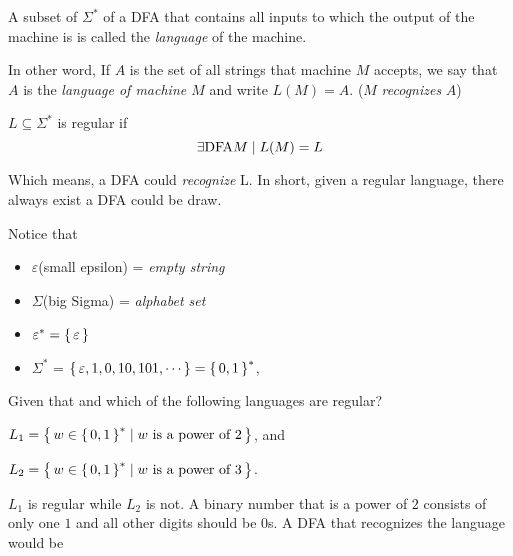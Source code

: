 
\begin{definition}

A subset of $\Sigma^*$ of a DFA that contains all inputs to which the output of the
machine is \true is called the \emph{language} of the machine.

\end{definition}

In other word, If $A$ is the set of all strings that machine $M$ accepts, we say that $A$
is the \emph{ language of machine $M$} and write $L(M) = A$. ($M$ \emph{recognizes} $A$)
\begin{definition}
    $ L \subseteq \Sigma^* $
    is regular if
    \[
        \exists {\text{\upshape DFA} M} \mid L(M) = L
    \]
\end{definition}

Which means, a DFA could \emph{recognize} L. In short, given a regular language, there
always exist a DFA could be draw.

Notice that 
\begin{itemize}
    \item
        $\varepsilon$(small epsilon) = \emph{ empty string } 
    \item
        $\Sigma$(big Sigma)          = \emph{ alphabet set } 
    \item
        $\varepsilon^*               = { \left\{\,\varepsilon\,\right\} }$  
    \item
        $\Sigma^*$                   = ${ \left\{\,\varepsilon,1,0,10,101,\cdots\,\right\} } = { \left\{\,0,1\,\right\} }^*$,
\end{itemize}

\begin{example}
    Given that
    and
    which of the following languages are regular?
    \begin{compactitem}
    \item
        $L_1 = { \left\{\, w \in { \left\{\,0,1\,\right\} }^* \mid w \text{ is a power of } 2\,\right\} }$, and
    \item
        $L_2 = { \left\{\, w \in { \left\{\,0,1\,\right\} }^* \mid w \text{ is a power of } 3\,\right\} }$.
    \end{compactitem}
    
    $L_1$ is regular while $L_2$ is not. A binary number that is a power of $2$ consists
    of only one $1$ and all other digits should be $0$s. A DFA that recognizes the
    language would be

\end{example}

